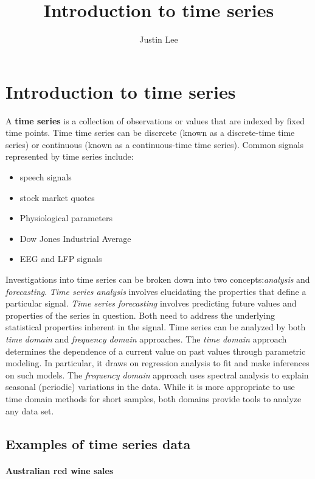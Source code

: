 \documentclass[12pt,a4paper]{article}
\author{Justin Lee}
\title{Introduction to time series}
\begin{document}
\section*{Introduction to time series}
A \textbf{time series} is a collection of observations or values that are indexed by fixed time points. Time time series can be discrcete (known as a discrete-time time series) or continuous (known as a continuous-time time series). Common signals represented by time series include:

\begin{itemize}
	\item speech signals
	\item stock market quotes
	\item Physiological parameters
	\item Dow Jones Industrial Average
	\item EEG and LFP signals
\end{itemize}

Investigations into time series can be broken down into two concepts:\textit{analysis} and \textit{forecasting}. \textit{Time series analysis} involves elucidating the properties that define a particular signal. \textit{Time series forecasting} involves predicting future values and properties of the series in question. Both need to address the underlying statistical properties inherent in the signal. Time series can be analyzed by both \textit{time domain} and \textit{frequency domain} approaches. The \textit{time domain} approach determines the dependence of a current value on past values through parametric modeling. In particular, it draws on regression analysis to fit and make inferences on such models. The \textit{frequency domain} approach uses spectral analysis to explain seasonal (periodic) variations in the data. While it is more appropriate to use time domain methods for short samples, both domains provide tools to analyze any data set.

\subsection*{Examples of time series data}
\paragraph{Australian red wine sales}
\end{document}
